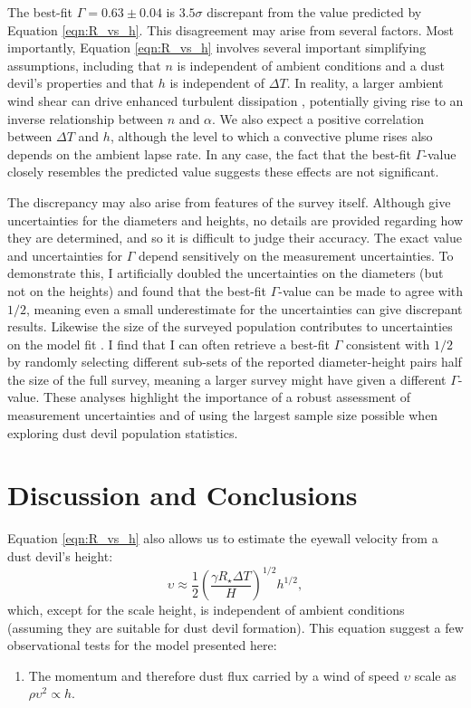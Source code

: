 \documentclass{aastex63}
\begin{document}
The best-fit $\Gamma = 0.63 \pm 0.04$ is $3.5\sigma$ discrepant from the value predicted by Equation \ref{eqn:R_vs_h}. This disagreement may arise from several factors. Most importantly, Equation \ref{eqn:R_vs_h} involves several important simplifying assumptions, including that $n$ is independent of ambient conditions and a dust devil's properties and that $h$ is independent of $\Delta T$. In reality, a larger ambient wind shear can drive enhanced turbulent dissipation \citep{arya1988}, potentially giving rise to an inverse relationship between $n$ and $\alpha$. We also expect a positive correlation between $\Delta T$ and $h$, although the level to which a convective plume rises also depends on the ambient lapse rate. In any case, the fact that the best-fit $\Gamma$-value closely resembles the predicted value suggests these effects are not significant.

The discrepancy may also arise from features of the survey itself. Although \citet{2008Icar..197...39S} give uncertainties for the diameters and heights, no details are provided regarding how they are determined, and so it is difficult to judge their accuracy. The exact value and uncertainties for $\Gamma$ depend sensitively on the measurement uncertainties. To demonstrate this, I artificially doubled the uncertainties on the diameters (but not on the heights) and found that the best-fit $\Gamma$-value can be made to agree with $1/2$, meaning even a small underestimate for the uncertainties can give discrepant results. Likewise the size of the surveyed population contributes to uncertainties on the model fit \citet{2015JGRE..120..401J}. I find that I can often retrieve a best-fit $\Gamma$ consistent with $1/2$ by randomly selecting different sub-sets of the reported diameter-height pairs half the size of the full survey, meaning a larger survey might have given a different $\Gamma$-value. These analyses highlight the importance of a robust assessment of measurement uncertainties and of using the largest sample size possible when exploring dust devil population statistics.

\section{Discussion and Conclusions}
\label{sec:discussion}

Equation \ref{eqn:R_vs_h} also allows us to estimate the eyewall velocity from a dust devil's height:
\begin{equation}
    \upsilon \approx \frac{1}{2} \left( \dfrac{\gamma R_\star \Delta T}{H} \right)^{1/2} h^{1/2},\label{eqn:velocity_vs_h}
\end{equation}
which, except for the scale height, is independent of ambient conditions (assuming they are suitable for dust devil formation). This equation suggest a few observational tests for the model presented here:
\begin{enumerate}
    \item The momentum and therefore dust flux carried by a wind of speed $\upsilon$ scale as $\rho \upsilon^2 \propto h$. 
\end{enumerate}
\end{document}
